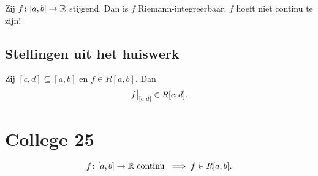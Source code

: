 \documentclass{2wa40summary}
\begin{document}
			\begin{theorem}[\text{[K] 6.2.2}]
				Zij $ f\colon [a,b] \to \mathbb{R} $ stijgend. Dan is $f$ Riemann-integreerbaar.
				\opm $f$ hoeft niet continu te zijn!
			\end{theorem}
			
		\subsection{Stellingen uit het huiswerk}
			\begin{theorem}
				Zij $ [c,d] \subseteq [a,b] $ en $ f \in R[a,b] $. Dan 
				\[ 
					\restr{f}{[c,d]}  \in R[c,d].
				 \]
			\end{theorem}
			
		\newpage
		\section{College 25}
			\begin{theorem}[\text{[K]} 6.2.3]
				\[ 
					f\colon [a,b] \to \mathbb{R} \text{ continu } \implies f \in R[a,b].
				 \]
			\end{theorem}
\end{document}
